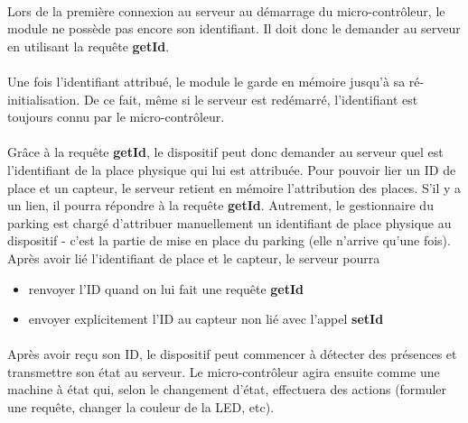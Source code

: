 
\paragraph*{}
Lors de la première connexion au serveur au démarrage du micro-contrôleur, le module ne possède pas encore son identifiant. Il doit donc le demander au serveur en utilisant la requête \textbf{getId}.



\paragraph*{}
Une fois l'identifiant attribué, le module le garde en mémoire jusqu'à sa ré-initialisation. De ce fait, même si le serveur est redémarré, l'identifiant est toujours connu par le micro-contrôleur.

\paragraph*{}
Grâce à la requête \textbf{getId}, le dispositif peut donc demander au serveur quel est l'identifiant de la place physique qui lui est attribuée. Pour pouvoir lier un ID de place et un capteur, le serveur retient en mémoire l'attribution des places. S'il y a un lien, il pourra répondre à la requête \textbf{getId}. Autrement, le gestionnaire du parking est chargé d'attribuer manuellement un identifiant de place physique au dispositif - c'est la partie de mise en place du parking (elle n'arrive qu'une fois).
Après avoir lié l'identifiant de place et le capteur, le serveur pourra
\begin{itemize}
    \item renvoyer l'ID quand on lui fait une requête \textbf{getId}
    \item envoyer explicitement l'ID au capteur non lié avec l'appel \textbf{setId}
\end{itemize}



\paragraph*{}
Après avoir reçu son ID, le dispositif peut commencer à détecter des présences et transmettre son état au serveur. Le micro-contrôleur agira ensuite comme une machine à état qui, selon le changement d'état, effectuera des actions (formuler une requête, changer la couleur de la LED, etc).

